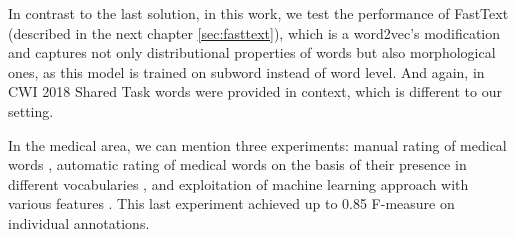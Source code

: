 In contrast to the last solution, in this work, we test the performance of FastText (described in the next chapter \ref{sec:fasttext}), which is a word2vec's modification and captures not only distributional properties of words but also morphological ones, as this model is trained on subword instead of word level. And again, in  CWI 2018 Shared Task words were provided in context, which is different to our setting.

In the medical area, we can mention three experiments: manual rating
of medical words \citep{Zheng-AMIA2002}, automatic rating of medical
words on the basis of their presence in different vocabularies
\citep{Borst-MIE2008}, and exploitation of machine learning approach
with various features \citep{Grabar-PITR2014}. This last experiment
achieved up to 0.85 F-measure on individual annotations.


